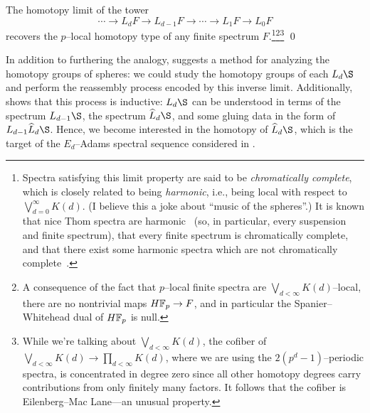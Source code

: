 \begin{theorem}\label{ChromaticConvergence}
The homotopy limit of the tower \[\cdots \to L_d F \to L_{d-1} F \to \cdots \to L_1 F \to L_0 F\] recovers the $p$--local homotopy type of any finite spectrum $F$.\footnote{Spectra satisfying this limit property are said to be \textit{chromatically complete}, which is closely related to being \textit{harmonic}, i.e., being local with respect to $\bigvee_{d=0}^\infty K(d)$.  (I believe this a joke about ``music of the spheres''.)  It is known that nice Thom spectra are harmonic~\cite{Kriz} (so, in particular, every suspension and finite spectrum), that every finite spectrum is chromatically complete, and that there exist some harmonic spectra which are not chromatically complete~\cite[Section 5.1]{Barthel}.}\footnote{A consequence of the fact that $p$--local finite spectra are $\bigvee_{d < \infty} K(d)$--local, there are no nontrivial maps $\HFp \to F$, and in particular the Spanier--Whitehead dual of $\HFp$ is null.}\footnote{While we're talking about $\bigvee_{d < \infty} K(d)$, the cofiber of $\bigvee_{d < \infty} K(d) \to \prod_{d < \infty} K(d)$, where we are using the $2(p^d-1)$--periodic spectra, is concentrated in degree zero since all other homotopy degrees carry contributions from only finitely many factors.  It follows that the cofiber is Eilenberg--Mac Lane---an unusual property.} \qed
\end{theorem}

In addition to furthering the analogy,  suggests a method for analyzing the homotopy groups of spheres: we could study the homotopy groups of each $L_d \S$ and perform the reassembly process encoded by this inverse limit.  Additionally,  shows that this process is inductive: $L_d \S$ can be understood in terms of the spectrum $L_{d-1} \S$, the spectrum $\widehat L_d \S$, and some gluing data in the form of $L_{d-1} \widehat L_d \S$.  Hence, we become interested in the homotopy of $\widehat L_d \S$, which is the target of the $E_d$--Adams spectral sequence considered in .

